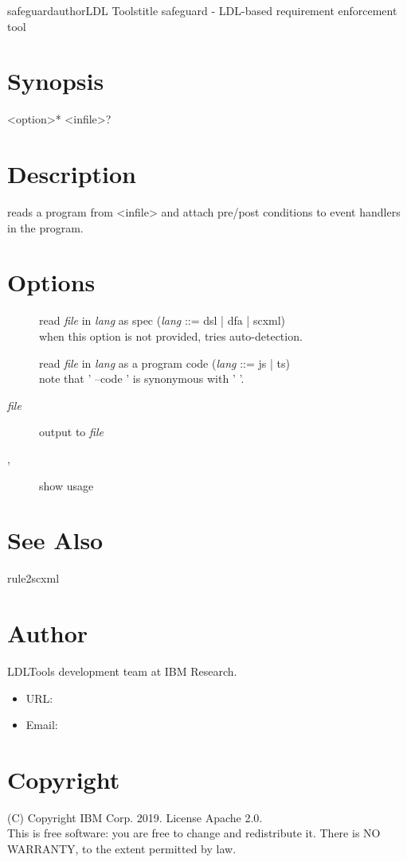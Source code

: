 \documentclass[fancy]{article}
\begin{document}
\begin{Name}{1}{safeguard}{author}{LDL Tools}{title}
safeguard - LDL-based requirement enforcement tool
\end{Name}

\section{Synopsis}
 <option>* <infile>?

\section{Description}
 reads a program from <infile>
and attach pre/post conditions to event handlers in the program.

\section{Options}

\begin{description}
\item[ ]
  read \emph{file} in \emph{lang} as spec (\emph{lang} ::= dsl | dfa | scxml)\\
  when this option is not provided,  tries auto-detection.
\item[ ]
  read \emph{file} in \emph{lang} as a program code (\emph{lang} ::= js | ts)\\
  note that ' --code ' is synonymous with ' '.
%
\item[ \emph{file}]
  output to \emph{file}
\item[, ]
  show usage

\end{description}

\section{See Also}
rule2scxml

\section{Author}
LDLTools development team at IBM Research.

\begin{itemize}
\item URL: 
\item Email: 
\end{itemize}

\section{Copyright}
(C) Copyright IBM Corp. 2019.
License Apache 2.0.\\

This is free software: you are free to change and redistribute it.
There is NO  WARRANTY,  to the extent permitted by law.
\end{document}
